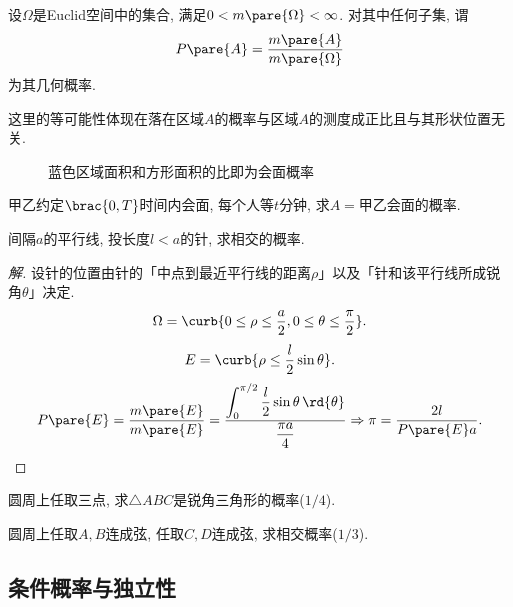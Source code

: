 \documentclass[../Statistics.tex]{subfiles}
\begin{document}
\begin{definition}
    设$\Omega$是Euclid空间中的集合, 满足$0 < m\pare{\Omega} < \infty$. 对其中任何子集, 谓
    \[ P\pare{A} = \frac{m\pare{A}}{m\pare{\Omega}} \]
    为其几何概率.
\end{definition}
\begin{remark}
    这里的等可能性体现在落在区域$A$的概率与区域$A$的测度成正比且与其形状位置无关.
\end{remark}
\begin{figure}[ht]
    \centering
    \caption{蓝色区域面积和方形面积的比即为会面概率}
\end{figure}
\begin{sample}
    \begin{ex}
        甲乙约定$\brac{0,T}$时间内会面, 每个人等$t$分钟, 求$A=$甲乙会面的概率.
    \end{ex}
\end{sample}
\begin{sample}
    \begin{ex}[Buffon投针实验]
        间隔$a$的平行线, 投长度$l<a$的针, 求相交的概率.
    \end{ex}
    \begin{proof}[解]
        设针的位置由针的「中点到最近平行线的距离$\rho$」以及「针和该平行线所成锐角$\theta$」决定.
        \[ \Omega = \curb{0 \le \rho \le \frac{a}{2}, 0 \le \theta \le \frac{\pi}{2}}. \]
        \[ E = \curb{\rho \le \frac{l}{2}\sin\theta}. \]
        \[ P\pare{E} = \frac{m\pare{E}}{m\pare{E}} = \frac{\displaystyle\int_0^{\pi/2}\frac{l}{2}\sin\theta\,\rd{\theta}}{\displaystyle\frac{\pi a}{4}}\Rightarrow \pi = \frac{2l}{P\pare{E}a}. \qedhere \]
    \end{proof}
\end{sample}
\begin{sample}
    \begin{ex}
        圆周上任取三点, 求$\bigtriangleup ABC$是锐角三角形的概率($1/4$).
    \end{ex}
    \begin{ex}
        圆周上任取$A,B$连成弦, 任取$C,D$连成弦, 求相交概率($1/3$).
    \end{ex}
\end{sample}


\subsection{条件概率与独立性} %
\label{sub:条件概率与独立性}
\end{document}
